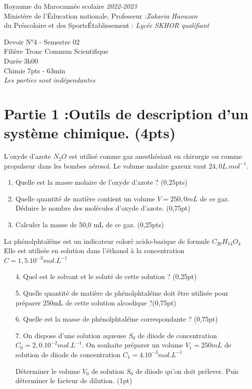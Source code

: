 \documentclass[12pt]{article}
\newcommand\headerMe[2]{\noindent{}#1\hfill#2}
\begin{document}
\headerMe{Royaume du Maroc}{année scolaire \emph{2022-2023}}\\
\headerMe{Ministère de l'Éducation nationale, }{  Professeur :\emph{Zakaria Haouzan}}\\
\headerMe{du Préscolaire et des Sports}{Établissement : \emph{Lycée SKHOR qualifiant}}\\

\begin{center}

Devoir  N°4 - Semestre 02 \\
   Filière Tronc Commun Scientifique\\
Durée 3h00
\\
\hrulefill
\Large{Chimie 7pts - 63min}
\hrulefill\\

    \emph{Les  parties sont indépendantes}
\end{center}
 
    
\section*{Partie 1 :Outils de description d'un système chimique. \dotfill (4pts) }
	L’oxyde d’azote $N_2O$ est utilisé comme gaz anesthésiant en chirurgie ou comme propulseur dans les bombes
	aérosol. Le volume molaire gazeux vaut $24,0 L.mol^{-1}$.

	\begin{enumerate}
		\item  Quelle est la masse molaire de l’oxyde d’azote ? \dotfill(0,25pts)
		\item Quelle quantité de matière contient un volume $V = 250,0 mL$ de ce gaz. Déduire le nombre des molécules d’oxyde d’azote. \dotfill (0,75pt)
		\item Calculer la masse de 50,0 mL de ce gaz. \dotfill (0,25pts)
\end{enumerate}

La phénolphtaléine est un indicateur coloré acido-basique de formule $C_{20}H_{14}O_4$ Elle est utilisée en solution
dans l’éthanol à la concentration $C=1,5.10^{-3}mol.L^{-1}$

\begin{enumerate}
	\item[4.] Quel est le solvant et le soluté de cette solution ? \dotfill(0,25pt)
	\item[5.]Quelle quantité de matière de phénolphtaléine doit être utilisée pour préparer 250mL de cette solution
alcoolique ?\dotfill (0,75pt)
\item[6.] Quelle est la masse de phénolphtaléine correspondante ? \dotfill (0,75pt)
\item[7.] On dispose d’une solution aqueuse $S_0$ de diiode de concentration $C_0 = 2,0.10^{-2} mol.L^{-1}$. On souhaite préparer un volume $V_1 = 250 mL$ de solution de diiode de concentration $C_1 = 4.10^{-3} mol.L^{-1}$

Déterminer le volume $V_0$ de solution $S_0$ de diiode qu’on doit prélever. Puis déterminer le facteur de dilution. \dotfill(1pt)

\end{enumerate}
\end{document}
